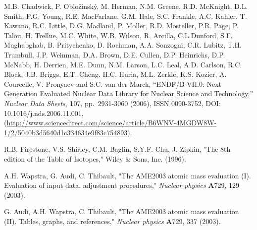  M.B. Chadwick, P. Oblo{\v z}insk{\' y}, M. Herman, N.M. Greene, R.D. McKnight, D.L. Smith, P.G. Young, R.E. MacFarlane, G.M. Hale, S.C. Frankle, A.C. Kahler, T. Kawano, R.C. Little, D.G. Madland, P. Moller, R.D. Mosteller, P.R. Page, P. Talou, H. Trellue, M.C. White, W.B. Wilson, R. Arcilla, C.L.Dunford, S.F. Mughabghab, B. Pritychenko, D. Rochman, A.A. Sonzogni, C.R. Lubitz, T.H. Trumbull, J.P. Weinman, D.A. Brown, D.E. Cullen, D.P. Heinrichs, D.P. McNabb, H. Derrien,
M.E. Dunn, N.M. Larson, L.C. Leal, A.D. Carlson, R.C. Block, J.B. Briggs, E.T. Cheng, H.C. Huria, M.L. Zerkle, K.S. Kozier, A. Courcelle, V. Pronyaev and S.C. van der Marck, ``{ENDF/B-VII.0}: Next Generation Evaluated Nuclear Data Library for Nuclear Science and Technology,''
{\em Nuclear Data Sheets}, {\textbf 107}, pp.~2931-3060 (2006), ISSN 0090-3752, DOI: 10.1016/j.nds.2006.11.001,
(\url{http://www.sciencedirect.com/science/article/B6WNV-4MGDW8W-1/2/5040b3d5640d1c334634e9f83c754893}).

 R.B. Firestone, V.S. Shirley, C.M. Baglin, S.Y.F. Chu, J. Zipkin, "The 8th edition of the Table of Isotopes," Wiley \& Sons, Inc. (1996).

 A.H. Wapstra, G. Audi, C. Thibault, "The AME2003 atomic mass evaluation (I). Evaluation of input data, adjustment procedures," {\em Nuclear physics} {\textbf A729,} 129 (2003).

 G. Audi, A.H. Wapstra, C. Thibault, "The AME2003 atomic mass evaluation (II). Tables, graphs, and references," {\em Nuclear physics} {\textbf A729,} 337 (2003).
